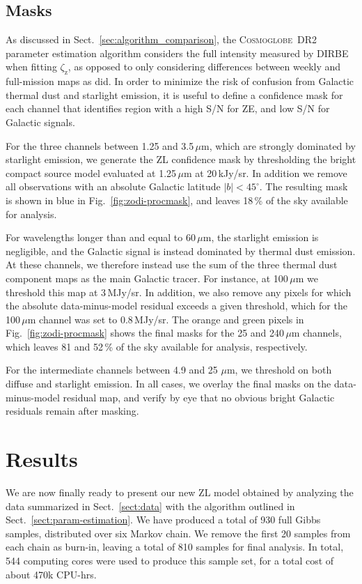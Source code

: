 \documentclass[twocolumn]{aa}
\newcommand{\cosmoglobe}{\textsc{Cosmoglobe}}
\begin{document}
\subsection{Masks}
\label{sec:masks}

As discussed in Sect.~\ref{sec:algorithm_comparison}, the
\cosmoglobe\ DR2 parameter estimation algorithm considers the full
intensity measured by DIRBE when fitting $\zeta_{\mathrm{z}}$, as
opposed to only considering differences between weekly and
full-mission maps as \citet{Kelsall1998} did. In order to minimize the
risk of confusion from Galactic thermal dust and starlight emission,
it is useful to define a confidence mask for each channel that
identifies region with a high S/N for ZE, and low S/N for Galactic
signals.

For the three channels between 1.25 and 3.5\,$\mu$m, which are
strongly dominated by starlight emission, we generate the ZL
confidence mask by thresholding the bright compact source model
evaluated at 1.25\,$\mu$m at 20\,kJy/sr. In addition we remove all
observations with an absolute Galactic latitude $|b|<45^{\circ}$. The
resulting mask is shown in blue in Fig.~\ref{fig:zodi-procmask}, and
leaves 18\,\% of the sky available for analysis.

For wavelengths longer than and equal to 60\,$\mu$m, the starlight
emission is negligible, and the Galactic signal is instead dominated
by thermal dust emission. At these channels, we therefore instead use
the sum of the three thermal dust component maps as the main Galactic
tracer. For instance, at 100$\,\mu$m we threshold this map at
3\,MJy/sr. In addition, we also remove any pixels for which the
absolute data-minus-model residual exceeds a given threshold, which
for the 100$\,\mu$m channel was set to 0.8\,MJy/sr. The orange and
green pixels in Fig.~\ref{fig:zodi-procmask} shows the final masks for
the 25 and 240\,$\mu$m channels, which leaves 81 and 52\,\% of the sky
available for analysis, respectively.

For the intermediate channels between 4.9 and 25\,$\,\mu$m, we
threshold on both diffuse and starlight emission. In all cases, we
overlay the final masks on the data-minus-model residual map, and
verify by eye that no obvious bright Galactic residuals remain after
masking. 


\section{Results}\label{sect:improved-model}
We are now finally ready to present our new ZL model obtained
by analyzing the data summarized in Sect.~\ref{sect:data} with the
algorithm outlined in Sect.~\ref{sect:param-estimation}. We have
produced a total of 930 full Gibbs samples, distributed over six
Markov chain. We remove the first 20 samples from each chain as
burn-in, leaving a total of 810 samples for final analysis. In total,
544 computing cores were used to produce this sample set, for a
total cost of about 470k CPU-hrs.
\end{document}
